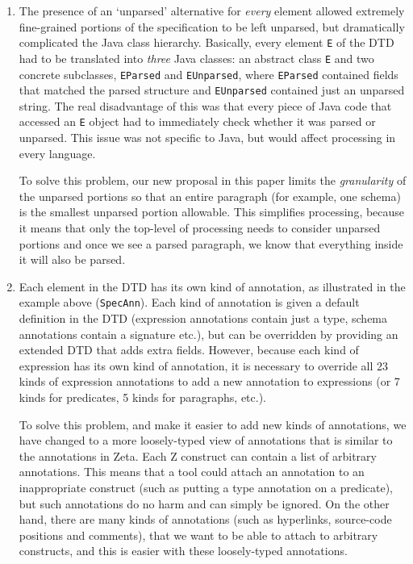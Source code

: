\documentclass{llncs}  %
\newcommand{\Zeta}{Zeta}
\begin{document}
\begin{enumerate}
\item The presence of an `unparsed' alternative for \emph{every} element
  allowed extremely fine-grained portions of the specification to be left
  unparsed, but dramatically complicated the Java class hierarchy.
  Basically, every element \verb!E! of the DTD had to be translated into
  \emph{three} Java classes: an abstract class \verb!E! and two concrete 
  subclasses, \verb!EParsed! and \verb!EUnparsed!, where \verb!EParsed!
  contained fields that matched the parsed structure and \verb!EUnparsed!
  contained just an unparsed string.  The real disadvantage of this was
  that every piece of Java code that accessed an \verb!E! object had to
  immediately check whether it was parsed or unparsed.  This issue was not
  specific to Java, but would affect processing in every language.
  
  To solve this problem, our new proposal in this paper limits the
  \emph{granularity} of the unparsed portions so that an entire paragraph
  (for example, one schema) is the smallest
  unparsed portion allowable.  This simplifies processing, because it means
  that only the top-level of processing needs to consider unparsed portions
  and once we see a parsed paragraph, we know that everything inside it
  will also be parsed.

\item Each element in the DTD has its own kind of annotation, as
  illustrated in the example above (\verb!SpecAnn!).  Each kind of
  annotation is given 
  a default definition in the DTD (expression annotations contain just a
  type, schema annotations contain a signature etc.), but can be
  overridden by providing an extended DTD that adds extra fields.
  However, because each kind of expression has its own kind of annotation,
  it is necessary to override all 23 kinds of expression annotations
  to add a new annotation to expressions (or 7 kinds for predicates, 
  5 kinds for paragraphs, etc.).
  
  To solve this problem, and make it easier to add new kinds of
  annotations, we have changed to a more loosely-typed view of annotations
  that is similar to the annotations in \Zeta.  Each Z construct can contain
  a list of arbitrary annotations.  This
  means that a tool could attach an annotation to an inappropriate
  construct (such as putting a type annotation on a predicate), but such
  annotations do no harm and can simply be ignored.  On the other hand,
  there are many kinds of annotations (such as hyperlinks, source-code
  positions and comments), that we want to be able to attach to arbitrary
  constructs, and this is easier with these loosely-typed annotations.
  

\end{enumerate}
\end{document}
